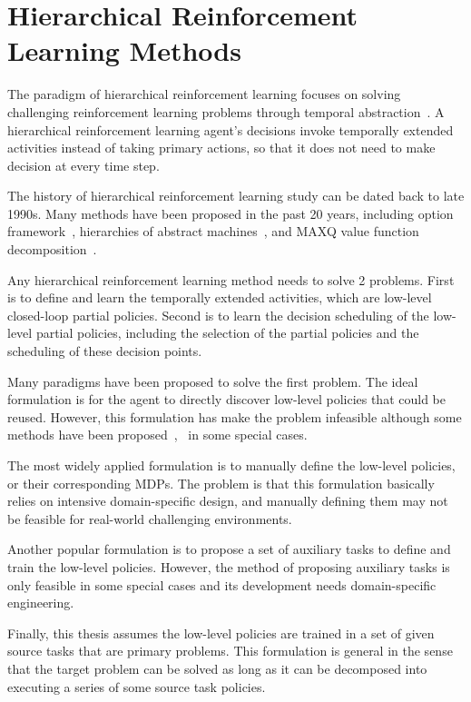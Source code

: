 \section{Hierarchical Reinforcement Learning Methods}

The paradigm of hierarchical reinforcement learning focuses on solving challenging reinforcement learning problems through temporal abstraction~\cite{barto2003recent}. A hierarchical reinforcement learning agent's decisions invoke temporally extended activities instead of taking primary actions, so that it does not need to make decision at every time step. 

The history of hierarchical reinforcement learning study can be dated back to late 1990s. Many methods have been proposed in the past 20 years, including option framework~\cite{sutton1999between}, hierarchies of abstract machines~\cite{parr1998reinforcement}, and MAXQ value function decomposition~\cite{dietterich2000hierarchical}.

Any hierarchical reinforcement learning method needs to solve 2 problems. First is to define and learn the temporally extended activities, which are low-level closed-loop partial policies. Second is to learn the decision scheduling of the low-level partial policies, including the selection of the partial policies and the scheduling of these decision points.

Many paradigms have been proposed to solve the first problem. The ideal formulation is for the agent to directly discover low-level policies that could be reused. However, this formulation has make the problem infeasible although some methods have been proposed~\cite{mcgovern2001automatic},~\cite{hengst2002discovering} in some special cases. 

The most widely applied formulation is to manually define the low-level policies, or their corresponding MDPs. The problem is that this formulation basically relies on intensive domain-specific design, and manually defining them may not be feasible for real-world challenging environments.

Another popular formulation is to propose a set of auxiliary tasks to define and train the low-level policies. However, the method of proposing auxiliary tasks is only feasible in some special cases and its development needs domain-specific engineering. 

Finally, this thesis assumes the low-level policies are trained in a set of given source tasks that are primary problems. This formulation is general in the sense that the target problem can be solved as long as it can be decomposed into executing a series of some source task policies.

